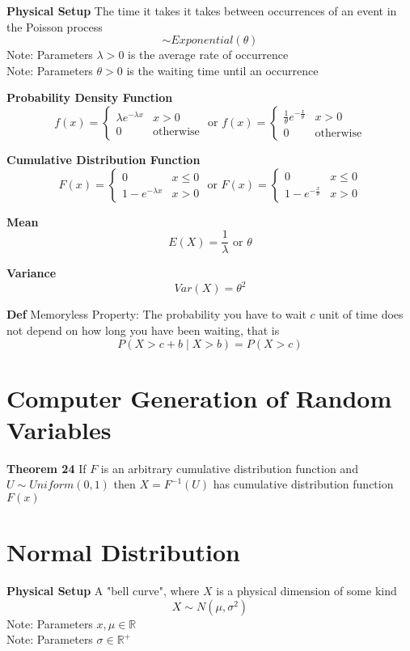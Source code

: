 \documentclass[11pt,notitlepage]{report}
\begin{document}
\textbf{Physical Setup} The time it takes it takes between occurrences of an event in the Poisson process
$$\sim Exponential(\theta)$$
\hspace*{5mm} Note: Parameters $\lambda > 0$ is the average rate of occurrence\\
\hspace*{5mm} Note: Parameters $\theta > 0$ is the waiting time until an occurrence

\textbf{Probability Density Function}
$$f(x) = \begin{cases}\lambda e^{-\lambda x} & x>0\\0 & \text{otherwise}\end{cases} \text{ or } f(x) = \begin{cases}\frac{1}{\theta} e^{-\frac{x}{\theta}} & x>0\\0 & \text{otherwise}\end{cases}$$

\textbf{Cumulative Distribution Function}
$$F(x) = \begin{cases}0 & x\leq 0\\ 1-e^{-\lambda x} & x > 0\end{cases} \text{ or } F(x) = \begin{cases}0 & x\leq 0\\ 1-e^{-\frac{x}{\theta}} & x > 0\end{cases}$$

\textbf{Mean}
$$E(X) = \frac{1}{\lambda} \text{ or } \theta$$

\textbf{Variance}
$$Var(X) = \theta^2$$

\textbf{Def} Memoryless Property: The probability you have to wait $c$ unit of time does not depend on how long you have been waiting, that is
$$P(X > c + b \mid X > b) = P(X > c)$$

\section{Computer Generation of Random Variables}

\textbf{Theorem 24} If $F$ is an arbitrary cumulative distribution function and $U \sim Uniform(0, 1)$ then $X = F^{-1}(U)$ has cumulative distribution function $F(x)$

\newpage
\section{Normal Distribution}

\textbf{Physical Setup} A "bell curve", where $X$ is a physical dimension of some kind
$$X \sim N(\mu, \sigma^2)$$
\hspace*{5mm} Note: Parameters $x, \mu \in \mathbb R$\\
\hspace*{5mm} Note: Parameters $\sigma \in \mathbb R^+$
\end{document}
